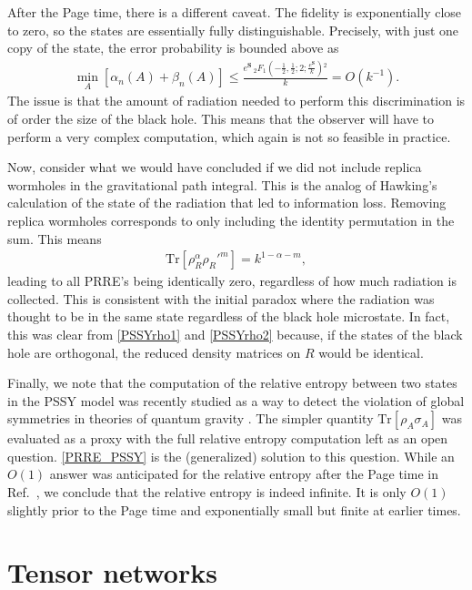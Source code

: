 \documentclass[a4paper,11pt]{article}
\newcommand{\Tr}{\text{Tr}}
\begin{document}
After the Page time, there is a different caveat. The fidelity is exponentially close to zero, so the states are essentially fully distinguishable. Precisely, with just one copy of the state, the error probability is bounded above as
\begin{align}
    \min_{A}\left[ \alpha_n(A) + \beta_n(A) \right] \leq \frac{e^{\textbf{S}} \,
   _2F_1\left(-\frac{1}{2},\frac{1}{2};2;\frac{e^\textbf{S}}{k}\right){}^2}{k} = O(k^{-1}).
\end{align}
The issue is that the amount of radiation needed to perform this discrimination is of order the size of the black hole. This means that the observer will have to perform a very complex computation, which again is not so feasible in practice.

Now, consider what we would have concluded if we did not include replica wormholes in the gravitational path integral. This is the analog of Hawking's calculation of the state of the radiation that led to information loss. Removing replica wormholes corresponds to only including the identity permutation in the sum. This means
\begin{align}
    \Tr \left[\rho_R^{\alpha}\rho_R'^{m} \right] =  k^{1-\alpha-m},
\end{align}
leading to all PRRE's being identically zero, regardless of how much radiation is collected. This is consistent with the initial paradox where the radiation was thought to be in the same state regardless of the black hole microstate. In fact, this was clear from \eqref{PSSYrho1} and \eqref{PSSYrho2} because, if the states of the black hole are orthogonal, the reduced density matrices on $R$ would be identical.

Finally, we note that the computation of the relative entropy between two states in the PSSY model was recently studied as a way to detect the violation of global symmetries in theories of quantum gravity \cite{2020arXiv201106005C}. The simpler quantity $\Tr\left[\rho_A \sigma_A \right]$ was evaluated as a proxy with the full relative entropy computation left as an open question. \eqref{PRRE_PSSY} is the (generalized) solution to this question. While an $O(1)$ answer was anticipated for the relative entropy after the Page time in Ref.~\cite{2020arXiv201106005C}, we conclude that the relative entropy is indeed infinite. It is only $O(1)$ slightly prior to the Page time and exponentially small but finite at earlier times.

\section{Tensor networks}
\label{sec_tensor}
\end{document}
